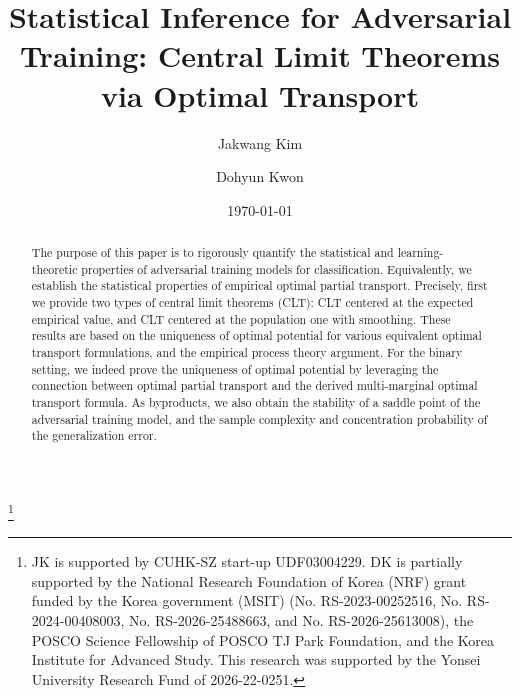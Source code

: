 \documentclass{amsart}
\title[Statistical Inference for Adversarial Training]{Statistical Inference for Adversarial Training: Central Limit Theorems via Optimal Transport}
\theoremstyle{plain}
\numberwithin{equation}{section}\newtheorem{theorem}{Theorem}[section]
\theoremstyle{remark}
\begin{document}
\author{Jakwang Kim}
\address{School of Data Science, The Chinese University of Hongkong, Shenzhen, Dao Yuan Building, 2001 Longxiang Boulevard, Longgang District, Shenzhen, Guangdong, China.}
\author{Dohyun Kwon}
\address{School of Mathematics \& Computing (Computational Science \& Engineering), Yonsei University, Seodaemun-gu, Seoul 03722, Republic of Korea.}
\address{Center for AI and Natural Sciences, Korea Institute for Advanced Study, Dongdaemun-gu, Seoul 02455, Republic of Korea.}




\date{\today}
\thanks{
JK is supported by CUHK-SZ start-up UDF03004229. DK is partially supported by the National Research Foundation of Korea (NRF) grant funded by the Korea government (MSIT) (No. RS-2023-00252516, No. RS-2024-00408003,  No. RS-2026-25488663, and No. RS-2026-25613008), the POSCO Science Fellowship of POSCO TJ Park Foundation, and the Korea Institute for Advanced Study. This research was supported by the Yonsei University Research Fund of 2026-22-0251.
}

\begin{abstract}
The purpose of this paper is to rigorously quantify the statistical and learning-theoretic properties of adversarial training models for classification. Equivalently, we establish the statistical properties of empirical optimal partial transport. Precisely, first we provide two types of central limit theorems (CLT): CLT centered at the expected empirical value, and CLT centered at the population one with smoothing. These results are based on the uniqueness of optimal potential for various equivalent optimal transport formulations, and the empirical process theory argument. For the binary setting, we indeed prove the uniqueness of optimal potential by leveraging the connection between optimal partial transport and the derived multi-marginal optimal transport formula. As byproducts, we also obtain the stability of a saddle point of the adversarial training model, and the sample complexity and concentration probability of the generalization error.
\end{abstract}

\maketitle
\tableofcontents
\end{document}
